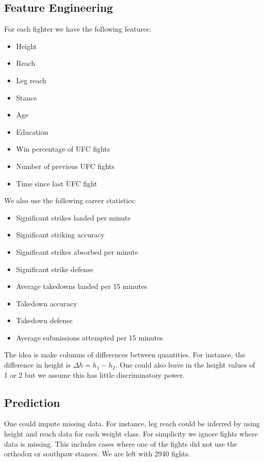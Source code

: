 \subsection*{Feature Engineering}

For each fighter we have the following features:

\begin{itemize}[noitemsep]
  \item Height
  \item Reach
  \item Leg reach
  \item Stance
  \item Age
  \item Education
  \item Win percentage of UFC fights
  \item Number of previous UFC fights
  \item Time since last UFC fight
\end{itemize}

\noindent
We also use the following career statistics:

\begin{itemize}[noitemsep]
  \item Significant strikes landed per minute
  \item Significant striking accuracy
  \item Significant strikes absorbed per minute
  \item Significant strike defense
  \item Average takedowns landed per 15 minutes
  \item Takedown accuracy
  \item Takedown defense
  \item Average submissions attempted per 15 minutes
\end{itemize}

The idea is make columns of differences between
quantities. For instance, the difference in
height is $\Delta h = h_1 - h_2$. One could also leave
in the height values of 1 or 2 but we assume this has
little discriminatory power.

\subsection*{Prediction}

One could impute missing data. For instance, leg reach
could be inferred by using height and reach data for
each weight class. For simplicity we ignore fights
where data is missing. This includes cases where one
of the fights did not use the orthodox or southpaw
stances. We are left with 2940 fights.

